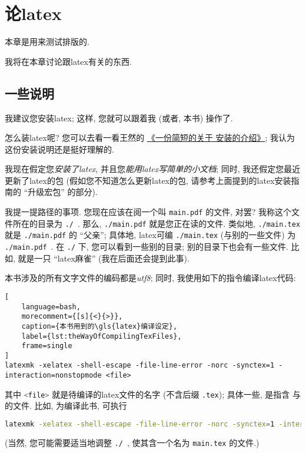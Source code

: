 \chapter{\theauthor{}论\texorpdfstring{\gls{latex}}{乳胶}}

\begin{remark*}
    本章是用来测试排版的.
\end{remark*}

我将在本章讨论跟\gls{latex}有关的东西.

\section{一些说明}

我建议您安装\gls{latex};
这样, 您就可以跟着我 (或者, 本书) 操作了.

怎么装\gls{latex}呢?
您可以去看一看王然的%
\href{http://mirrors.ctan.org/info/install-latex-guide-zh-cn/install-latex-guide-zh-cn.pdf}%
{《一份简短的关于  安装的介绍》};
我认为这份安装说明还是挺好理解的.

我现在假定您\emph{安装了\gls{latex}},
并且您\emph{能用\gls{latex}写简单的小文档};
同时, 我还假定您最近更新了\gls{latex}的包
(假如您不知道怎么更新\gls{latex}的包,
请参考上面提到的\gls{latex}安装指南的 ``升级宏包'' 的部分).

我提一提路径的事项.
您现在应该在阅一个叫 \verb`main.pdf` 的文件, 对罢?
我称这个文件所在的目录为 \verb`./`~.
那么, \verb`./main.pdf` 就是您正在读的文件.
类似地, \verb`./main.tex` 就是 \verb`./main.pdf` 的 ``父亲'';
具体地, \gls{latex}可编 \verb`./main.tex`
(与别的一些文件) 为 \verb`./main.pdf`~.
在 \verb`./` 下, 您可以看到一些别的目录;
别的目录下也会有一些文件.
比如,  就是一只 ``\gls{latex}麻雀''
(我在后面还会提到此事).

本书涉及的所有文字文件的编码都是\emph{\gls{utf8}};
同时, 我使用如下的指令编译\gls{latex}代码:
\begin{lstlisting}[
    language=bash,
    morecomment={[s]{<}{>}},
    caption={本书用到的\gls{latex}编译设定},
    label={lst:theWayOfCompilingTexFiles},
    frame=single
]
latexmk -xelatex -shell-escape -file-line-error -norc -synctex=1 -interaction=nonstopmode <file>
\end{lstlisting}
其中 \lstinline[language=bash,morecomment={[s]{<}{>}}]`<file>`
就是待编译的\gls{latex}文件的名字 (不含后缀 \verb`.tex`);
具体一些, 是指含 \verb``
与 \verb`` 的文件.
比如, 为编译此书, 可执行
\begin{lstlisting}[language=bash,morecomment={[s]{<}{>}}]
latexmk -xelatex -shell-escape -file-line-error -norc -synctex=1 -interaction=nonstopmode ./main
\end{lstlisting}
(当然, 您可能需要适当地调整 \verb`./`~,
使其含一个名为 \verb`main.tex` 的文件.)


